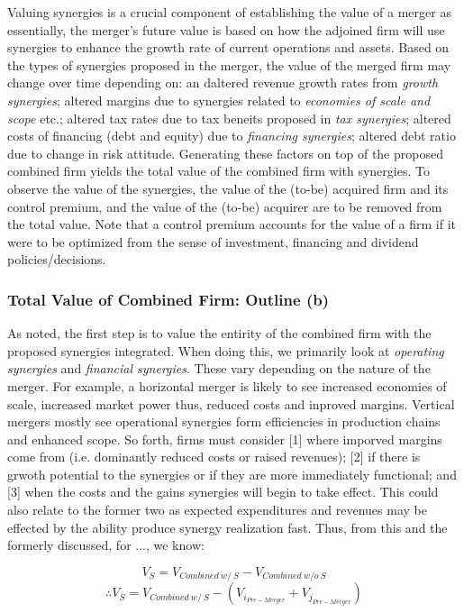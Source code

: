\documentclass[11pt, english]{article}
\begin{document}
	Valuing synergies is a crucial component of establishing the value of a merger as essentially, the merger's future value is based on how the adjoined firm will use synergies to enhance the growth rate of current operations and assets. Based on the types of synergies proposed in the merger, the value of the merged firm may change over time depending on: an daltered revenue growth rates from \textit{growth synergies}; altered margins due to synergies related to \textit{economies of scale and scope} etc.; altered tax rates due to tax beneits proposed in \textit{tax synergies}; altered costs of financing (debt and equity) due to \textit{financing synergies}; altered debt ratio due to change in risk attitude. Generating these factors on top of the proposed combined firm yields the total value of the combined firm with synergies. To observe the value of the synergies, the value of the (to-be) acquired firm and its control premium, and the value of the (to-be) acquirer are to be removed from the total value. Note that a control premium accounts for the value of a firm if it were to be optimized from the sense of investment, financing and dividend policies/decisions.

		\subsubsection*{Total Value of Combined Firm: Outline (b)}

	As noted, the first step is to value the entirity of the combined firm with the proposed synergies integrated. When doing this, we primarily look at \textit{operating synergies} and \textit{financial synergies}. These vary depending on the nature of the merger. For example, a horizontal merger is likely to see increased economies of scale, increased market power thus, reduced costs and inproved margins. Vertical mergers mostly see operational synergies form efficiencies in production chains and enhanced scope. So forth, firms must consider [1] where imporved margins come from (i.e. dominantly reduced costs or raised revenues); [2] if there is grwoth potential to the synergies or if they are more immediately functional; and [3] when the costs and the gains synergies will begin to take effect. This could also relate to the former two as expected expenditures and revenues may be effected by the ability produce synergy realization fast. Thus, from this and the formerly discussed, for ..., we know:

	$$V_S=V_{Combined\ w/\ S}-V_{Combined\ w/o\ S}$$
	$$\therefore V_S=V_{Combined\ w/\ S}-(V_{i_{Pre-Merger}}+V_{j_{Pre-Merger}})$$
\end{document}
